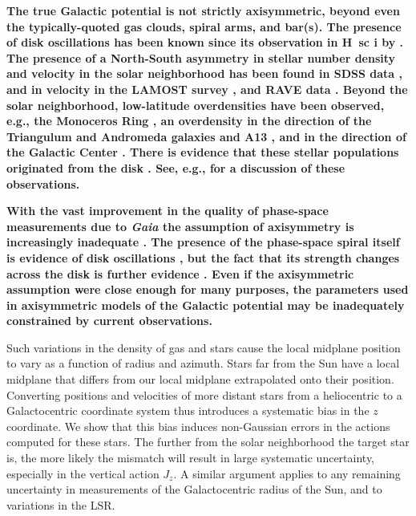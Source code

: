 \documentclass[twocolumn]{aastex62}
\begin{document}
\textbf{The true Galactic potential is not strictly axisymmetric, beyond even
the typically-quoted gas clouds, spiral arms, and bar(s). The presence of disk
oscillations has been known
    since its observation in H~{sc i} by \citet{1957AJ.....62...93K}.
The presence of a North-South
asymmetry in stellar number density and velocity in the solar neighborhood has
been found in
SDSS data \citep{2012ApJ...750L..41W}, and in velocity in the
LAMOST survey \citep{2013ApJ...777L...5C, 2015ApJ...801..105X}, and RAVE data
\citep{2013MNRAS.436..101W}. Beyond the solar neighborhood, low-latitude
overdensities have been observed, e.g., the Monoceros Ring
\citep{2002ApJ...569..245N, 2003MNRAS.340L..21I, 2003ApJ...594L.119C,
2014ApJ...791....9S, 2016ApJ...825..140M}, an overdensity in the direction of
the Triangulum and Andromeda galaxies \citep{2007ApJ...668L.123M,
2014ApJ...793...62S, 2015ApJ...801..105X, 2015MNRAS.452..676P} and A13
\citep{2010ApJ...722..750S, 2017ApJ...844...74L}, and in the direction of the
Galactic Center \citep{2014Natur.509..342F}. There is evidence that these
stellar populations originated from the disk \citep{2015MNRAS.452..676P, 2018ApJ...854...47S,
2018Natur.555..334B}. See, e.g., \citet{2018MNRAS.481..286L} for a discussion
of these observations.}

\textbf{With the vast improvement in the quality of phase-space measurements
due to \textit{Gaia} the assumption of axisymmetry is increasingly inadequate
\citep[e.g.,][]{2018Natur.561..360A, 2019MNRAS.485.3134L}. The presence of the
phase-space spiral itself is evidence of disk oscillations
\citep{2018Natur.561..360A}, but the fact that its strength changes across the
disk is further evidence \citep{2019MNRAS.485.3134L, 2019MNRAS.486.1167B}. Even if the axisymmetric
assumption were close enough for many purposes, the parameters used in
axisymmetric models of the Galactic potential may be inadequately constrained
by current observations.}

     Such
variations in the density of gas and stars cause the local
midplane position to vary as a function of radius and azimuth. Stars far from
the Sun have a local midplane that differs from our local midplane
extrapolated onto their position. Converting positions and velocities of more
distant stars from a heliocentric to a Galactocentric coordinate system thus
introduces a systematic bias in the $z$ coordinate. We show that this bias
induces non-Gaussian errors in the actions computed for these stars. The
further from the solar neighborhood the target star is, the more likely the
mismatch will result in large systematic uncertainty, especially in the
vertical action $J_z$. A similar argument applies to any remaining uncertainty
in measurements of the Galactocentric radius of the Sun, and to variations in
the LSR.
\end{document}

